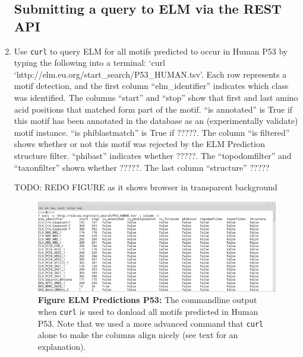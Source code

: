 \begin{enumerate}

%
%
\subsection{Submitting a query to ELM via the REST API}
\label{subsec:predicting_REST_submitting}

\item Use \texttt{curl} to query ELM for all motifs predicted to occur in Human
	P53 by typing the following into a terminal: `curl
	`http://elm.eu.org/start\_search/P53\_HUMAN.tsv'. Each row represents a
	motif detection, and the first column ``elm\_identifier'' indicates
	which class was identified. The columns ``start'' and ``stop'' show
	that first and last amino acid positions that matched form part of the
	motif.  ``is annotated'' is True if this motif has been annotated in
	the database as an (experimentally validate) motif instance. ``is
	phiblastmatch'' is True if ?????. The column ``is filtered'' shows
	whether or not this motif was rejected by the ELM Prediction structure
	filter. ``phibast'' indicates whether ?????. The ``topodomfilter'' and
	``taxonfilter'' shown whether ?????. The last column ``structure''
	?????


TODO: REDO FIGURE as it shows browser in transparent background

\begin{figure}[h!]
	\centering
	\includegraphics[width=\textwidth]{Figures/predicting_REST/curl_P53.png}
	\caption{
	\textbf{Figure ELM Predictions P53:}
	The commandline output when \texttt{curl} is used to
	donload all motifs predicted in Human P53. Note that we used a more
	advanced command that \texttt{curl} alone to make the columns align
	nicely (see text for an explanation).
	}
\end{figure}


\end{enumerate}
